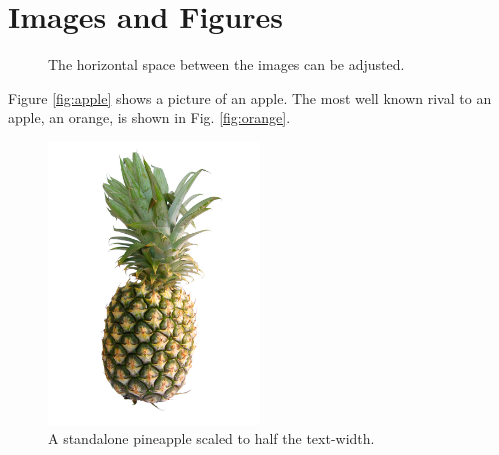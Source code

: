 \documentclass[a4paper, 12pt]{article}
\begin{document}
\section{Images and Figures}
\begin{figure}[h]
  \centering
  \hspace{40pt}
  \caption{The horizontal space between the images can be adjusted.}
\end{figure}
Figure \ref{fig:apple} shows a picture of an apple. The most well known rival to an apple, an orange, is shown in Fig. \ref{fig:orange}.
\pagebreak
\begin{figure}[h]
	\centering
	\includegraphics[width=0.5\textwidth]{images/pineapple}
	\caption{A standalone pineapple scaled to half the text-width.}
	\label{fig:pineapple}
\end{figure}
\end{document}

